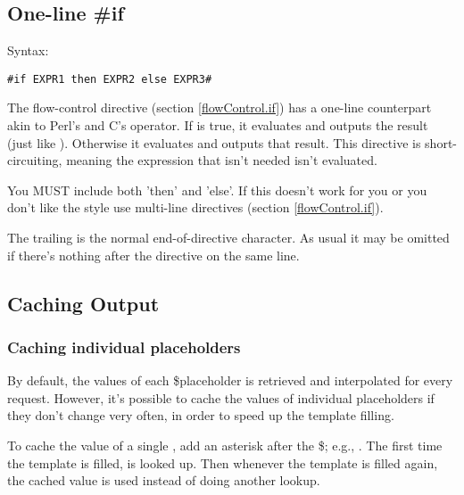 \subsection{One-line \#if}
\label{output.oneLineIf}

Syntax:
\begin{verbatim}
#if EXPR1 then EXPR2 else EXPR3#
\end{verbatim}

The  flow-control directive (section \ref{flowControl.if}) has a
one-line counterpart akin to Perl's and C's  operator.
If  is true, it evaluates  and outputs the result (just
like ).  Otherwise it evaluates  and outputs
that result.  This directive is short-circuiting, meaning the expression that
isn't needed isn't evaluated.

You MUST include both 'then' and 'else'.  If this doesn't work for you or you
don't like the style use multi-line  directives (section
\ref{flowControl.if}).

The trailing \code{\#} is the normal end-of-directive character.  As usual
it may be omitted if there's nothing after the directive on the same line.


\subsection{Caching Output}
\label{output.caching}

\subsubsection{Caching individual placeholders}
\label{output.caching.placeholders}

By default, the values of each \$placeholder is retrieved and
interpolated for every request. However, it's possible to cache the values
of individual placeholders if they don't change very often, in order to 
speed up the template filling.
                         
To cache the value of a single , add an asterisk after the
\$; e.g.,  .  The first time the template is
filled,  is looked up.  Then whenever the template is filled again,
the cached value is used instead of doing another lookup.  

